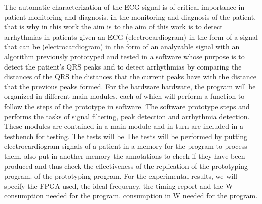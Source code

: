     The automatic characterization of the ECG signal is of critical importance in patient monitoring and diagnosis. 
	in the monitoring and diagnosis of the patient, that is why in this work the aim is to 
	the aim of this work is to detect arrhythmias in patients given an ECG (electrocardiogram) in the form of a signal that can be 
	(electrocardiogram) in the form of an analyzable signal with an algorithm previously prototyped and tested in a software 
    whose purpose is to detect the patient's QRS peaks and to detect arrhythmias by comparing the distances of the QRS 
    the distances that the current peaks have with the distance that the previous peaks formed. For the hardware 
    hardware, the program will be organized in different main modules, each of which will perform a function to follow the steps of the prototype in software. 
    The software prototype steps and performs the tasks of signal filtering, peak detection and arrhythmia detection.
    These modules are contained in a main module and in turn are included in a testbench for testing. The tests will be 
    The tests will be performed by putting electrocardiogram signals of a patient in a memory for the program to process them. 
    also put in another memory the annotations to check if they have been produced and thus check the effectiveness of the replication of the prototyping program.
    of the prototyping program. For the experimental results, we will specify the FPGA used, the ideal frequency, the timing report and the W consumption needed for the program. 
    consumption in W needed for the program. 
